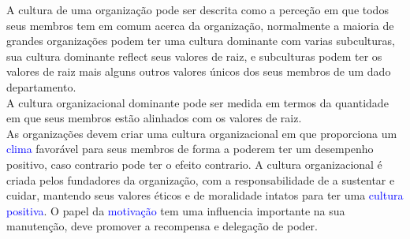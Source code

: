 A cultura de uma organização pode ser descrita como a perceção em que todos seus membros tem em comum acerca da organização, normalmente a maioria de grandes organizações podem ter uma cultura dominante com varias subculturas, sua cultura dominante reflect seus valores de raiz, e subculturas podem ter os valores de raiz mais alguns outros valores únicos dos seus membros de um dado departamento. \\
A cultura organizacional dominante pode ser medida em termos da quantidade em que seus membros estão alinhados com os valores de raiz. \\
As organizações devem criar uma cultura organizacional em que proporciona um \textcolor{blue}{clima} favorável para seus membros de forma a poderem ter um desempenho positivo, caso contrario pode ter o efeito contrario. A cultura organizacional é criada pelos fundadores da organização, com a responsabilidade de a sustentar e cuidar, mantendo seus valores éticos e de moralidade intatos para ter uma \textcolor{blue}{cultura positiva}. O papel da \textcolor{blue}{motivação} tem uma influencia importante na sua manutenção, deve promover a recompensa e delegação de poder.\cite{book_4} \cite{book_2}\\
\\
